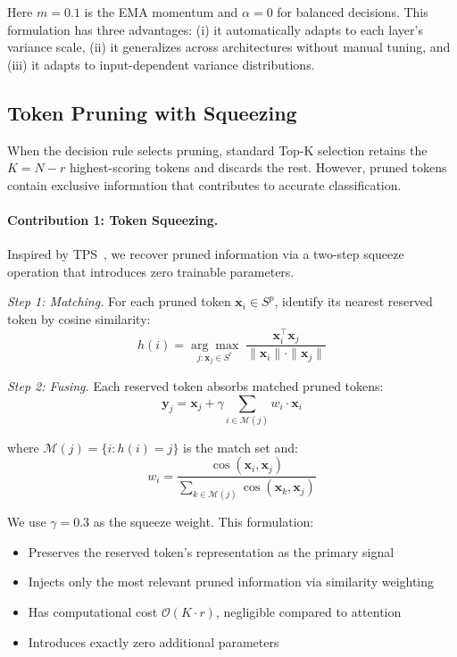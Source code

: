 \documentclass[10pt,twocolumn,letterpaper]{article}
\begin{document}
Here $m = 0.1$ is the EMA momentum and $\alpha = 0$ for balanced decisions.
This formulation has three advantages: (i) it automatically adapts to each
layer's variance scale, (ii) it generalizes across architectures without
manual tuning, and (iii) it adapts to input-dependent variance distributions.


\subsection{Token Pruning with Squeezing}
\label{sec:squeezing}

When the decision rule selects pruning, standard Top-K selection retains the
$K = N - r$ highest-scoring tokens and discards the rest. However, pruned tokens
contain exclusive information that contributes to accurate classification.

\paragraph{Contribution 1: Token Squeezing.}
Inspired by TPS~\cite{wei2023tps}, we recover pruned information via a
two-step squeeze operation that introduces zero trainable parameters.

\textit{Step 1: Matching.} For each pruned token $\mathbf{x}_i \in S^p$,
identify its nearest reserved token by cosine similarity:
\begin{equation}
\label{eq:matching}
h(i) = \underset{j: \mathbf{x}_j \in S^r}{\arg\max}\;
\frac{\mathbf{x}_i^\top \mathbf{x}_j}{\|\mathbf{x}_i\| \cdot \|\mathbf{x}_j\|}
\end{equation}

\textit{Step 2: Fusing.} Each reserved token absorbs matched pruned tokens:
\begin{equation}
\label{eq:fusing}
\mathbf{y}_j = \mathbf{x}_j + \gamma \sum_{i \in \mathcal{M}(j)} w_i \cdot \mathbf{x}_i
\end{equation}

where $\mathcal{M}(j) = \{i : h(i) = j\}$ is the match set and:
\begin{equation}
w_i = \frac{\cos(\mathbf{x}_i, \mathbf{x}_j)}
{\sum_{k \in \mathcal{M}(j)} \cos(\mathbf{x}_k, \mathbf{x}_j)}
\end{equation}

We use $\gamma = 0.3$ as the squeeze weight. This formulation:
\begin{itemize}
\item Preserves the reserved token's representation as the primary signal
\item Injects only the most relevant pruned information via similarity weighting
\item Has computational cost $\mathcal{O}(K \cdot r)$, negligible compared to attention
\item Introduces exactly zero additional parameters
\end{itemize}
\end{document}
